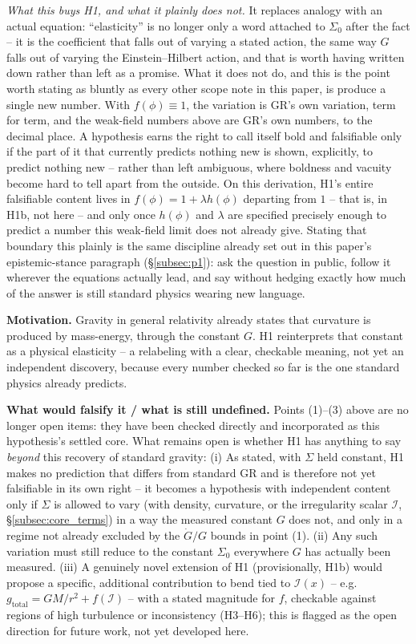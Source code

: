 \documentclass[12pt, a4paper]{article}
\begin{document}
\emph{What this buys H1, and what it plainly does not.} It replaces
analogy with an actual equation: ``elasticity'' is no longer only a
word attached to $\Sigma_0$ after the fact -- it is the coefficient
that falls out of varying a stated action, the same way $G$ falls out
of varying the Einstein--Hilbert action, and that is worth having
written down rather than left as a promise. What it does not do, and
this is the point worth stating as bluntly as every other scope note
in this paper, is produce a single new number. With $f(\phi)\equiv1$,
the variation is GR's own variation, term for term, and the
weak-field numbers above are GR's own numbers, to the decimal place.
A hypothesis earns the right to call itself bold and falsifiable only
if the part of it that currently predicts nothing new is shown,
explicitly, to predict nothing new -- rather than left ambiguous, where
boldness and vacuity become hard to tell apart from the outside. On
this derivation, H1's entire falsifiable content lives in
$f(\phi)=1+\lambda h(\phi)$ departing from $1$ -- that is, in H1b, not
here -- and only once $h(\phi)$ and $\lambda$ are specified precisely
enough to predict a number this weak-field limit does not already
give. Stating that boundary this plainly is the same discipline
already set out in this paper's epistemic-stance paragraph
(\S\ref{subsec:p1}): ask the question in public, follow it
wherever the equations actually lead, and say without hedging exactly
how much of the answer is still standard physics wearing new language.

\textbf{Motivation.} Gravity in general relativity already states
that curvature is produced by mass-energy, through the constant $G$.
H1 reinterprets that constant as a physical elasticity -- a
relabeling with a clear, checkable meaning, not yet an independent
discovery, because every number checked so far is the one standard
physics already predicts.

\textbf{What would falsify it / what is still undefined.}
Points (1)--(3) above are no longer open items: they have been
checked directly and incorporated as this hypothesis's settled core.
What remains open is whether H1 has anything to say \emph{beyond}
this recovery of standard gravity:
(i) As stated, with $\Sigma$ held constant, H1 makes no prediction
that differs from standard GR and is therefore not yet falsifiable in
its own right -- it becomes a hypothesis with independent content
only if $\Sigma$ is allowed to vary (with density, curvature, or the
irregularity scalar $\mathcal{I}$, \S\ref{subsec:core_terms}) in a way
the measured constant $G$ does not, and only in a regime not already
excluded by the $\dot G/G$ bounds in point (1). (ii) Any such
variation must still reduce to the constant $\Sigma_0$ everywhere $G$
has actually been measured. (iii) A genuinely novel extension of H1
(provisionally, H1b) would propose a specific, additional contribution
to bend tied to $\mathcal{I}(x)$ -- e.g.\ $g_{\text{total}} = GM/r^2 +
f(\mathcal{I})$ -- with a stated magnitude for $f$, checkable against
regions of high turbulence or inconsistency (H3--H6); this is flagged
as the open direction for future work, not yet developed here.
\end{document}
